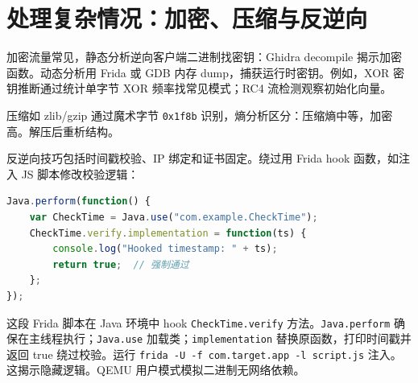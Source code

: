 \chapter{处理复杂情况：加密、压缩与反逆向}
加密流量常见，静态分析逆向客户端二进制找密钥：Ghidra decompile 揭示加密函数。动态分析用 Frida 或 GDB 内存 dump，捕获运行时密钥。例如，XOR 密钥推断通过统计单字节 XOR 频率找常见模式；RC4 流检测观察初始化向量。\par
压缩如 zlib/gzip 通过魔术字节 \texttt{0x1f8b} 识别，熵分析区分：压缩熵中等，加密高。解压后重析结构。\par
反逆向技巧包括时间戳校验、IP 绑定和证书固定。绕过用 Frida hook 函数，如注入 JS 脚本修改校验逻辑：\par
\begin{lstlisting}[language=javascript]
Java.perform(function() {
    var CheckTime = Java.use("com.example.CheckTime");
    CheckTime.verify.implementation = function(ts) {
        console.log("Hooked timestamp: " + ts);
        return true;  // 强制通过
    };
});
\end{lstlisting}
这段 Frida 脚本在 Java 环境中 hook \texttt{CheckTime.verify} 方法。\texttt{Java.perform} 确保在主线程执行；\texttt{Java.use} 加载类；\texttt{implementation} 替换原函数，打印时间戳并返回 true 绕过校验。运行 \texttt{frida -U -f com.target.app -l script.js} 注入。这揭示隐藏逻辑。QEMU 用户模式模拟二进制无网络依赖。\par
